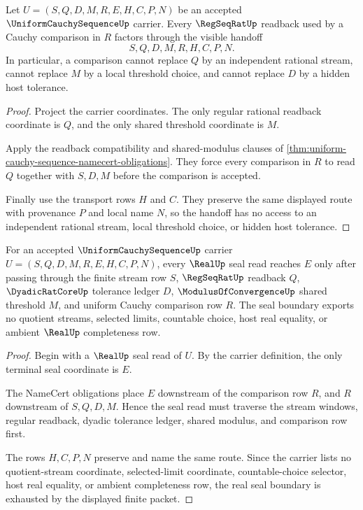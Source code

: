 \begin{theorem}
\label{thm:uniform-cauchy-sequence-regseqrat-handoff}
Let $U=(S,Q,D,M,R,E,H,C,P,N)$ be an accepted $\UniformCauchySequenceUp$ carrier. Every $\RegSeqRatUp$ readback used by a Cauchy comparison in $R$ factors through the visible handoff
$$
S,Q,D,M,R,H,C,P,N.
$$
In particular, a comparison cannot replace $Q$ by an independent rational stream, cannot replace $M$ by a local threshold choice, and cannot replace $D$ by a hidden host tolerance.
\end{theorem}
\begin{proof}
Project the carrier coordinates. The only regular rational readback coordinate is $Q$, and the only shared threshold coordinate is $M$.

Apply the readback compatibility and shared-modulus clauses of \autoref{thm:uniform-cauchy-sequence-namecert-obligations}. They force every comparison in $R$ to read $Q$ together with $S,D,M$ before the comparison is accepted.

Finally use the transport rows $H$ and $C$. They preserve the same displayed route with provenance $P$ and local name $N$, so the handoff has no access to an independent rational stream, local threshold choice, or hidden host tolerance.
\end{proof}

\begin{theorem}
\label{thm:uniform-cauchy-sequence-real-seal-boundary}
For an accepted $\UniformCauchySequenceUp$ carrier $U=(S,Q,D,M,R,E,H,C,P,N)$, every $\RealUp$ seal read reaches $E$ only after passing through the finite stream row $S$, $\RegSeqRatUp$ readback $Q$, $\DyadicRatCoreUp$ tolerance ledger $D$, $\ModulusOfConvergenceUp$ shared threshold $M$, and uniform Cauchy comparison row $R$. The seal boundary exports no quotient streams, selected limits, countable choice, host real equality, or ambient $\RealUp$ completeness row.
\end{theorem}
\begin{proof}
Begin with a $\RealUp$ seal read of $U$. By the carrier definition, the only terminal seal coordinate is $E$.

The NameCert obligations place $E$ downstream of the comparison row $R$, and $R$ downstream of $S,Q,D,M$. Hence the seal read must traverse the stream windows, regular readback, dyadic tolerance ledger, shared modulus, and comparison row first.

The rows $H,C,P,N$ preserve and name the same route. Since the carrier lists no quotient-stream coordinate, selected-limit coordinate, countable-choice selector, host real equality, or ambient completeness row, the real seal boundary is exhausted by the displayed finite packet.
\end{proof}

